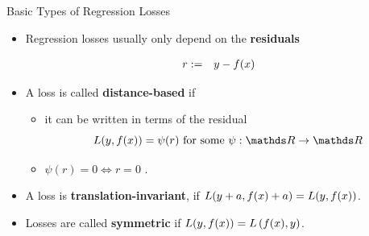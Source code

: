 \begin{vbframe}{Basic Types of Regression Losses}


\begin{itemize}
  \item Regression losses usually only depend on the \textbf{ residuals}

  \vspace*{-0.5cm}

  \begin{eqnarray*}
    r &:=& y - \fx %
  \end{eqnarray*}

  \item A loss is called \textbf{distance-based} if
  \begin{itemize}
    \item it can be written in terms of the residual
    $$
      \Lxy = \psi (r) \text{ for some } \psi: \R \to \R
    $$
    \item $\psi(r) = 0 \Leftrightarrow r = 0$ .
  \end{itemize}
  \item A loss is \textbf{translation-invariant}, if $L(y + a, f(x) + a) = L(y, f(x))$.
  \item Losses are called \textbf{symmetric} if $L(y, f(x)) = L\left(f(x), y\right)$. 
\end{itemize}

\end{vbframe}

